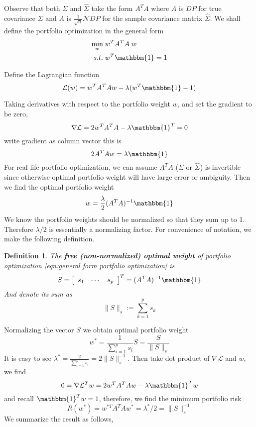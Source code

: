 \documentclass[12pt]{extarticle}
\newtheorem{definition}[other]{Definition}
\newcommand{\cL}{{\mathcal{L}}}
\newcommand{\cN}{{\mathcal{N}}}
\newcommand{\1}{\mathbbm{1}}
\newcommand{\mat}[2][rrrrrrrrrrrrrrrrrrrrrrrrrrrrrrrr]{\left[ \begin{array}{#1} #2 \\ \end{array}\right]}
\numberwithin{equation}{section}
\begin{document}
Observe that  both $\Sigma$ and $\hat{\Sigma}$ take the form $A^T A$ where $A$ is $DP$ for true covariance $\Sigma$ and $A$ is $\frac{1}{\sqrt{n}}\cN DP$ for the sample covariance matrix $\hat{\Sigma}$. We shall define the portfolio optimization in the general form 
\begin{equation}\label{eqn:general form portfolio optimization}
    \begin{split}
		\min_w \;& w^T A^T A \; w \\
		s.t. \;&  w^T \mathbbm{1} =1
    \end{split} 
\end{equation}

Define the Lagrangian function
\[
\cL(w) = w^T A^TA w - \lambda (w^T \1 -1)
\]

Taking derivatives with respect to the portfolio weight $w$, and set  the gradient to be zero, 
\[
\nabla \cL = 2 w^TA^TA - \lambda \1^T =0
\]
write gradient as column vector this is 
\[
2A^TA w = \lambda \1
\]
For real life portfolio optimization, we can assume $A^TA$ ($\Sigma$ or $\hat{\Sigma}$) is invertible since otherwise optimal portfolio weight will have large error or ambiguity.  Then we  find the optimal portfolio weight 
\[
w = \frac{\lambda}{2} (A^TA)^{-1}\1
\]
We know the portfolio weights should be normalized so that they sum up to 1. Therefore $\lambda/2$ is essentially a normalizing factor. 
For convenience of notation, we make the following definition. 
\begin{definition}
    The \textbf{free (non-normalized) optimal weight} of portfolio optimization \ref{eqn:general form portfolio optimization}  is 
    \[
    S=  \mat[ccc]{s_1 & \cdots & s_p}^T = (A^TA)^{-1}\1  
    \]
    And denote its sum as 
    \[
    \|S\|_s := \sum_{k=1}^p s_k
    \]
\end{definition}
Normalizing the vector $S$ we obtain optimal portfolio weight 
\[
w^* = \frac{1}{\sum_{i=1}^p s_i} S = \frac{S}{\|S\|_s}
\]
It is easy to see $\lambda^* = \frac{2}{\sum_{i=1}^p s_i} = 2 \|S\|_s^{-1}$.
Then take dot product of $\nabla \cL$ and $w$, we  find 
\[
0= \nabla \cL^T w = 2 w^TA^TA w - \lambda \1^T w 
\]
and recall $\1^T w =1$, therefore, we find the minimum portfolio risk
\[
R(w^*) = w^{*T}A^TA w^* = \lambda^* /2 = \|S\|_s^{-1}
\]
We summarize the result as follows,
\end{document}
